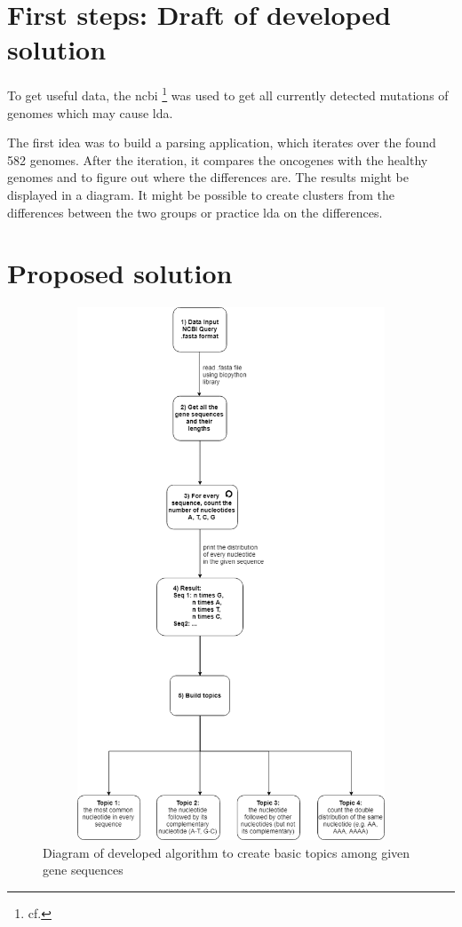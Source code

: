 \section{First steps: Draft of developed solution}\label{draft}

To get useful data, the \gls{ncbi} \footnote{cf.\autocite{ncbi}} was used to get all currently detected mutations of genomes which may cause \gls{lda}.

The first idea was to build a parsing application, which iterates over the found 582 genomes. After the iteration, it compares the oncogenes with the healthy genomes and to figure out where the differences are. The results might be displayed in a diagram. It might be possible to create clusters from the differences between the two groups or practice \gls{lda} on the differences.

\section{Proposed solution}\label{proposed_solution}

\begin{figure}[htbp]
	\centering
	\includegraphics[width=1\textwidth, height=600px, keepaspectratio]{Image/creating_topics_algorithm.png}
	\caption{Diagram of developed algorithm to create basic topics among given gene sequences}
	\label{algorithm_figure}
\end{figure}

